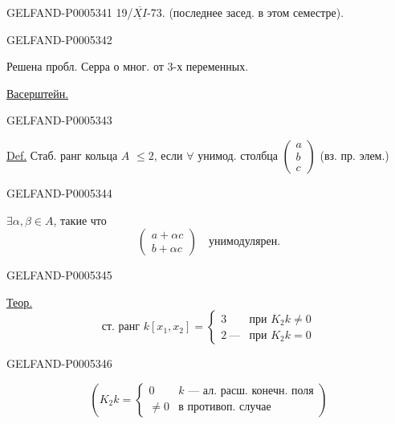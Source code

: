 \begin{GelfandAdjacentEvidence}{GELFAND-P000534}{1}
19/\mbox{$\overline{\underline{XI}}$}-73.\qquad{} (последнее засед. в этом семестре).
\end{GelfandAdjacentEvidence}
\begin{GelfandAdjacentEvidence}{GELFAND-P000534}{2}


Решена пробл. Серра о мног. от 3-х переменных.

\uline{Васерштейн.}
\end{GelfandAdjacentEvidence}
\begin{GelfandAdjacentEvidence}{GELFAND-P000534}{3}


\uline{Def.} Стаб. ранг кольца $A$ $\le2$, если $\forall$ унимод. столбца
$\begin{pmatrix}a\\b\\c\end{pmatrix}$ (вз. пр. элем.)
\end{GelfandAdjacentEvidence}
\begin{GelfandAdjacentEvidence}{GELFAND-P000534}{4}

$\exists\alpha,\beta\in A$, такие что
\[
\begin{pmatrix}a+\alpha c\\b+\alpha c\end{pmatrix}
\quad\text{унимодулярен}.
\]
\end{GelfandAdjacentEvidence}
\begin{GelfandAdjacentEvidence}{GELFAND-P000534}{5}


\uline{Теор.}
\[
\text{ст. ранг } k[x_1,x_2]=
\begin{cases}
3 & \text{при }K_2k\ne0\\
2\ \text{—} & \text{при }K_2k=0
\end{cases}
\]
\end{GelfandAdjacentEvidence}
\begin{GelfandAdjacentEvidence}{GELFAND-P000534}{6}

\[
\left(
K_2k=
\begin{cases}
0 & k\text{ — ал. расш. конечн. поля}\\
\ne0 & \text{в противоп. случае}
\end{cases}
\right)
\]
\end{GelfandAdjacentEvidence}



